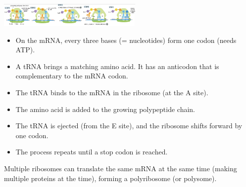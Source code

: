 \includegraphics[width=70mm]{src/Images/translation_ribosome.png}\\ 
\begin{itemize}
    \item On the mRNA, every three bases (= nucleotides) form one codon (needs ATP).
    \item A tRNA brings a matching amino acid. It has an anticodon that is complementary to the mRNA codon.
    \item The tRNA binds to the mRNA in the ribosome (at the A site).
    \item The amino acid is added to the growing polypeptide chain.
    \item The tRNA is ejected (from the E site), and the ribosome shifts forward by one codon.
    \item The process repeats until a stop codon is reached.
\end{itemize}
Multiple ribosomes can translate the same mRNA at the same time (making multiple proteins at the time), forming a polyribosome (or polysome).






